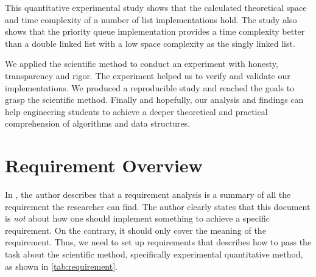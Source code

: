 \documentclass[a4paper,11pt]{kth-mag}
\newcommand*{\skippara}{\par\vspace{\baselineskip} \noindent}
\begin{document}
This quantitative experimental study shows that the calculated theoretical space and time complexity of a number of list implementations hold.
The study also shows that the priority queue implementation provides a time complexity better than
a double linked list with a low space complexity as the singly linked list.

\skippara
We applied the scientific method to conduct an experiment with honesty, transparency and rigor.
The experiment helped us to verify and validate our implementations.
We produced a reproducible study and reached the goals to grasp the scientific method.
Finally and hopefully, our analysis and findings can help engineering students to achieve a deeper theoretical and practical comprehension of algorithms and data structures.

%
\appendix
\addappheadtotoc

\chapter{Requirement Overview}\label{app:A}

In \cite{web:requirementoverview}, the author describes that a requirement analysis is a summary of all the requirement the researcher can find.
The author clearly states that this document is \emph{not} about how one should implement something to achieve a specific requirement.
On the contrary, it should only cover the meaning of the requirement.
Thus, we need to set up requirements that describes how to pass the task about the scientific method, specifically experimental quantitative method, as shown in \cref{tab:requirement}.
\end{document}
